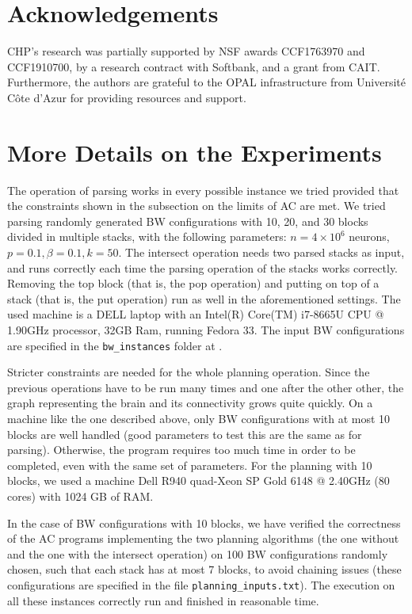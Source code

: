 \documentclass[letterpaper]{article}
\begin{document}
 


\section*{Acknowledgements}
CHP's research was partially supported by NSF awards CCF1763970 and CCF1910700, by a research contract with Softbank, and a grant from CAIT. Furthermore, the authors are grateful to the OPAL infrastructure from Universit\'e C\^ote d'Azur for providing resources and support.


%



\appendix
\section{More Details on the Experiments}

The operation of parsing works in every possible instance we tried provided that the constraints shown in the subsection on the limits of AC are met. We tried parsing randomly generated BW configurations with 10, 20, and 30 blocks divided in multiple stacks, with the following parameters: $n = 4\times 10^6$ neurons, $p = 0.1, \beta = 0.1, k = 50$. The intersect operation needs two parsed stacks as input, and runs correctly each time the parsing operation of the stacks works correctly. Removing the top block (that is, the pop operation) and putting on top of a stack (that is, the put operation) run as well in the aforementioned settings. The used machine is a DELL laptop with an Intel(R) Core(TM) i7-8665U CPU @ 1.90GHz processor, 32GB Ram, running Fedora 33. The input BW configurations are specified in the \texttt{bw\_instances} folder at \cite{jBrain}.

Stricter constraints are needed for the whole planning operation. Since the previous operations have to be run many times and one after the other other, the graph representing the brain and its connectivity grows quite quickly. On a machine like the one described above, only BW configurations with at most 10 blocks are well handled (good parameters to test this are the same as for parsing). Otherwise, the program requires too much time in order to be completed, even with the same set of parameters. For the planning with 10 blocks, we used a machine Dell R940 quad-Xeon SP Gold 6148 @ 2.40GHz (80 cores) with 1024 GB of RAM.

In the case of BW configurations with 10 blocks, we have verified the correctness of the AC programs implementing the two planning algorithms (the one without and the one with the intersect operation) on 100 BW configurations randomly chosen, such that each stack has at most 7 blocks, to avoid chaining issues (these configurations are specified in the file \texttt{planning\_inputs.txt}). The execution on all these instances correctly run and finished in reasonable time.
\end{document}
